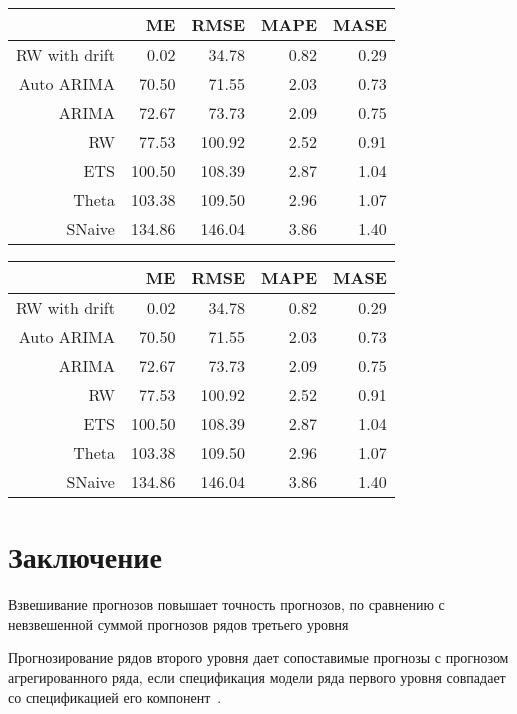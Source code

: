 \documentclass[12pt,a4paper, oneside]{extreport}
\begin{document}
\begin{table}[ht]
	\centering
	\begin{tabular}{rrrrr}
		\hline
		& ME & RMSE & MAPE & MASE \\ 
		\hline
		RW with drift  & 0.02 & 34.78 & 0.82 & 0.29 \\ 
		Auto ARIMA & 70.50 & 71.55 & 2.03 & 0.73 \\ 
		ARIMA & 72.67 & 73.73 & 2.09 & 0.75 \\ 
		RW & 77.53 & 100.92 & 2.52 & 0.91 \\ 
		ETS & 100.50 & 108.39 & 2.87 & 1.04 \\ 
		Theta & 103.38 & 109.50 & 2.96 & 1.07 \\ 
		SNaive & 134.86 & 146.04 & 3.86 & 1.40 \\ 
		\hline
	\end{tabular}
\end{table}

\begin{tabular}{rrrrr}
	\hline
	& ME & RMSE & MAPE & MASE \\ 
	\hline
	RW with drift  & 0.02 & 34.78 & 0.82 & 0.29 \\ 
	Auto ARIMA & 70.50 & 71.55 & 2.03 & 0.73 \\ 
	ARIMA & 72.67 & 73.73 & 2.09 & 0.75 \\ 
	RW & 77.53 & 100.92 & 2.52 & 0.91 \\ 
	ETS & 100.50 & 108.39 & 2.87 & 1.04 \\ 
	Theta & 103.38 & 109.50 & 2.96 & 1.07 \\ 
	SNaive & 134.86 & 146.04 & 3.86 & 1.40 \\ 
	\hline
\end{tabular}




\chapter*{Заключение}

Взвешивание прогнозов повышает точность прогнозов, по сравнению с невзвешенной суммой прогнозов рядов третьего уровня

Прогнозирование рядов второго уровня дает сопоставимые прогнозы с прогнозом агрегированного ряда, если спецификация модели ряда первого уровня совпадает со спецификацией его компонент~\cite{usstat1}. 



\end{document}
